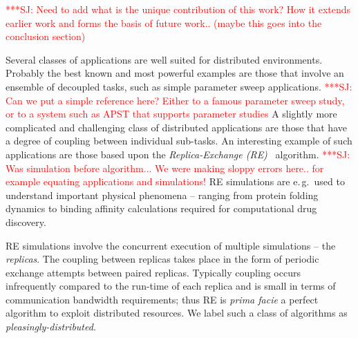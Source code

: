 \documentclass{rspublic}
\newcommand{\jhanote}[1]{ {\textcolor{red} { ***SJ: #1 }}}
\newcommand{\jhanote}[1]{}
\begin{document}
\jhanote{Need to add what is the unique contribution of this work? How
  it extends earlier work and forms the basis of future work.. (maybe
  this goes into the conclusion section)}

Several classes of applications are well suited for distributed
environments. Probably the best known and most powerful examples are
those that involve an ensemble of decoupled tasks, such as simple
parameter sweep applications. \jhanote{Can we put a simple reference
  here? Either to a famous parameter sweep study, or to a system such
  as APST that supports parameter studies} A slightly more complicated
and challenging class of distributed applications are those that have
a degree of coupling between individual sub-tasks.  An interesting
example of such applications are those based upon the
\emph{Replica-Exchange (RE)}~\citep{hansmann,Sugita:1999rm}
algorithm. \jhanote{Was simulation before algorithm... We were making
  sloppy errors here.. for example equating applications and
  simulations!} RE simulations are e.\,g.\ used to understand
important physical phenomena -- ranging from protein folding dynamics
to binding affinity calculations required for computational drug
discovery.
  
RE simulations involve the concurrent execution of multiple
simulations -- the \emph{replicas}. The coupling between replicas
takes place in the form of periodic exchange attempts between paired
replicas. Typically coupling occurs infrequently compared to the
run-time of each replica and is small in terms of communication
bandwidth requirements; thus RE is {\it prima facie} a perfect
algorithm to exploit distributed resources. We label such a class of
algorithms as {\it pleasingly-distributed}.

\end{document}
